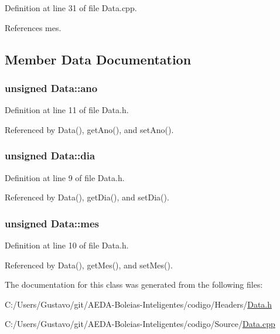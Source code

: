 Definition at line 31 of file Data.\+cpp.



References mes.



\subsection{Member Data Documentation}
\hypertarget{class_data_a662fc8d7cc87332b0204470c21b08383}{
\subsubsection[{ano}]{\setlength{\rightskip}{0pt plus 5cm}unsigned Data\+::ano\hspace{0.3cm}{\ttfamily [protected]}}}\label{class_data_a662fc8d7cc87332b0204470c21b08383}


Definition at line 11 of file Data.\+h.



Referenced by Data(), get\+Ano(), and set\+Ano().

\hypertarget{class_data_afd7c86fbe8808298e8ac555d15374c97}{
\subsubsection[{dia}]{\setlength{\rightskip}{0pt plus 5cm}unsigned Data\+::dia\hspace{0.3cm}{\ttfamily [protected]}}}\label{class_data_afd7c86fbe8808298e8ac555d15374c97}


Definition at line 9 of file Data.\+h.



Referenced by Data(), get\+Dia(), and set\+Dia().

\hypertarget{class_data_a52f02cba5bf54c79dc1dd93545d27e5f}{
\subsubsection[{mes}]{\setlength{\rightskip}{0pt plus 5cm}unsigned Data\+::mes\hspace{0.3cm}{\ttfamily [protected]}}}\label{class_data_a52f02cba5bf54c79dc1dd93545d27e5f}


Definition at line 10 of file Data.\+h.



Referenced by Data(), get\+Mes(), and set\+Mes().



The documentation for this class was generated from the following files\+:\begin{DoxyCompactItemize}
\item 
C\+:/\+Users/\+Gustavo/git/\+A\+E\+D\+A-\/\+Boleias-\/\+Inteligentes/codigo/\+Headers/\hyperlink{_data_8h}{Data.\+h}\item 
C\+:/\+Users/\+Gustavo/git/\+A\+E\+D\+A-\/\+Boleias-\/\+Inteligentes/codigo/\+Source/\hyperlink{_data_8cpp}{Data.\+cpp}\end{DoxyCompactItemize}
